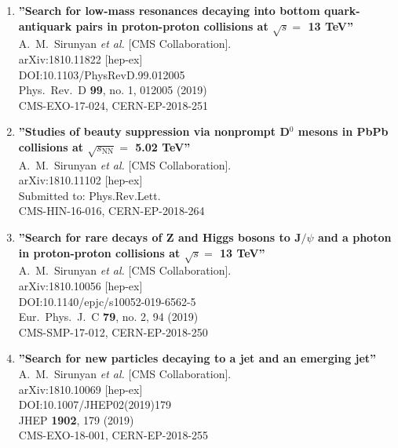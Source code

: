\begin{enumerate}
\item%
{\bf ''Search for low-mass resonances decaying into bottom quark-antiquark pairs in proton-proton collisions at $\sqrt{s} =$ 13 TeV''}
  \\{}A.~M.~Sirunyan {\it et al.} [CMS Collaboration].
  \\{}arXiv:1810.11822 [hep-ex]
  \\{}DOI:10.1103/PhysRevD.99.012005
  \\{}Phys.\ Rev.\ D {\bf 99}, no. 1, 012005 (2019)
  \\{}CMS-EXO-17-024, CERN-EP-2018-251

\item%
{\bf ''Studies of beauty suppression via nonprompt D$^0$ mesons in PbPb collisions at $\sqrt{s_\mathrm{NN}}=$ 5.02 TeV''}
  \\{}A.~M.~Sirunyan {\it et al.} [CMS Collaboration].
  \\{}arXiv:1810.11102 [hep-ex]
  \\{}Submitted to: Phys.Rev.Lett.
  \\{}CMS-HIN-16-016, CERN-EP-2018-264

\item%
{\bf ''Search for rare decays of Z and Higgs bosons to J$/\psi$ and a photon in proton-proton collisions at $\sqrt{s} =$ 13 TeV''}
  \\{}A.~M.~Sirunyan {\it et al.} [CMS Collaboration].
  \\{}arXiv:1810.10056 [hep-ex]
  \\{}DOI:10.1140/epjc/s10052-019-6562-5
  \\{}Eur.\ Phys.\ J.\ C {\bf 79}, no. 2, 94 (2019)
  \\{}CMS-SMP-17-012, CERN-EP-2018-250

\item%
{\bf ''Search for new particles decaying to a jet and an emerging jet''}
  \\{}A.~M.~Sirunyan {\it et al.} [CMS Collaboration].
  \\{}arXiv:1810.10069 [hep-ex]
  \\{}DOI:10.1007/JHEP02(2019)179
  \\{}JHEP {\bf 1902}, 179 (2019)
  \\{}CMS-EXO-18-001, CERN-EP-2018-255


\end{enumerate}
